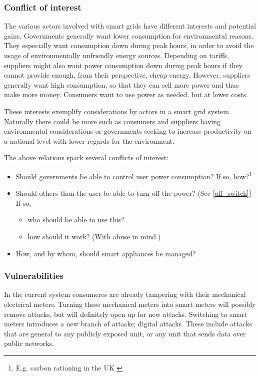 \subsubsection{Conflict of interest}
The various actors involved with smart grids have different interests and potential gains.
Governments generally want lower consumption for environmental reasons.
They especially want consumption down during peak hours, in order to avoid the usage of environmentally unfriendly energy sources.
Depending on tariffs, suppliers might also want power consumption down during peak hours if they cannot provide enough, from their perspective, cheap energy.
However, suppliers generally want high consumption, so that they can sell more power and thus make more money.
Consumers want to use power as needed, but at lower costs.

These interests exemplify considerations by actors in a smart grid system.
Naturally there could be more such as consumers and suppliers having environmental considerations or governments seeking to increase productivity on a national level with lower regards for the environment.

The above relations spark several conflicts of interest:
\begin{itemize}
	\item Should governments be able to control user power consumption? If so, how?\footnote{E.g. carbon rationing in the UK \cite{security_economics}}
	\item Should others than the user be able to turn off the power? (See \cref{off_switch}) If so,
	\begin{itemize}
		\item who should be able to use this?
		\item how should it work? (With abuse in mind.)
	\end{itemize}
	\item How, and by whom, should smart appliances be managed?
\end{itemize}

\subsubsection{Vulnerabilities}
In the current system consumeres are already tampering  with their mechanical electrical meters.
Turning these mechanical meters into smart meters will possibly remove attacks, but will definitely open up for new attacks.
Switching to smart meters introduces a new branch of attacks; digital attacks.
These include attacks that are general to any publicly exposed unit, or any unit that sends data over public networks.
